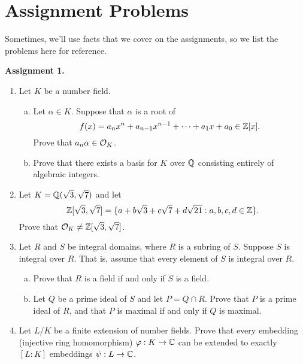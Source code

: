 \appendix 
\section{Assignment Problems}
Sometimes, we'll use facts that we cover on the assignments, 
so we list the problems here for reference. 

{\bf Assignment 1.} 
\begin{enumerate}[leftmargin=1.5cm, label={{\bf A1-\arabic*}}]
    \item \label{A1-1} Let $K$ be a number field. \begin{enumerate}[(a)]
        \item Let $\alpha \in K$. Suppose that $\alpha$ is a root of 
        \[ f(x) = a_n x^n + a_{n-1} x^{n-1} + \cdots + a_1 x + a_0 \in \mathbb{Z}[x]. \] 
        Prove that $a_n \alpha \in {\cal O}_K$. 
        \item Prove that there exists a basis for 
        $K$ over $\mathbb{Q}$ consisting entirely of algebraic integers. 
    \end{enumerate} 
    \item \label{A1-2} Let $K = \mathbb{Q}(\sqrt{3}, \sqrt{7})$ and let 
    \[ \mathbb{Z}[\sqrt{3}, \sqrt{7}] = \{a + b\sqrt{3} + c\sqrt{7} + d\sqrt{21} : 
    a, b, c, d \in \mathbb{Z}\}. \] 
    Prove that ${\cal O}_K \neq \mathbb{Z}[\sqrt{3}, \sqrt{7}]$. 
    \item \label{A1-3} Let $R$ and $S$ be integral domains, where $R$ is a subring of $S$. 
    Suppose $S$ is integral over $R$. That is, assume that every element of 
    $S$ is integral over $R$. 
    \begin{enumerate}[(a)]
        \item Prove that $R$ is a field if and only if $S$ is a field. 
        \item Let $Q$ be a prime ideal of $S$ and let $P = Q \cap R$. 
        Prove that $P$ is a prime ideal of $R$, and that $P$ is maximal 
        if and only if $Q$ is maximal.
    \end{enumerate}
    \item \label{A1-4} Let $L/K$ be a finite extension of number fields. 
    Prove that every embedding (injective ring homomorphism) $\varphi : 
    K \to \mathbb{C}$ can be extended to exactly $[L : K]$ embeddings $\psi : L \to \mathbb{C}$.
\end{enumerate}

